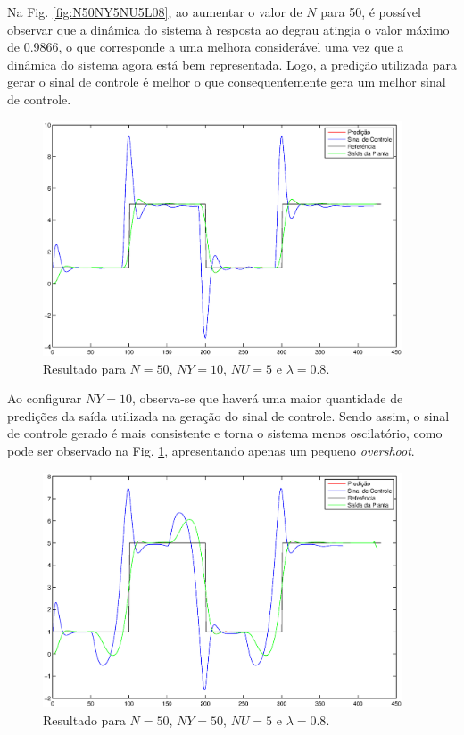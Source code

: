 Na Fig. \ref{fig:N50NY5NU5L08}, ao aumentar o valor de $N$ para 50, é possível
observar que a dinâmica do sistema à resposta ao degrau atingia o valor máximo
de 0.9866, o que corresponde a uma melhora considerável uma vez que a dinâmica
do sistema agora está bem representada. Logo, a predição utilizada para gerar o
sinal de controle é melhor o que consequentemente gera um melhor sinal de
controle.

\begin{figure}[htb]
\centering
    \includegraphics[width=0.95\textwidth]{imgs/questao1/N50NY10NU5L08}
    \caption{Resultado para $N = 50$, $NY = 10$, $NU = 5$ e $\lambda = 0.8$.}
    \label{fig:N50NY10NU5L08}
\end{figure}

Ao configurar $NY=10$, observa-se que haverá uma maior quantidade de predições
da saída utilizada na geração do sinal de controle. Sendo assim, o sinal de
controle gerado é mais consistente e torna o sistema menos oscilatório, como
pode ser observado na Fig. \ref{fig:N50NY10NU5L08}, apresentando apenas um
pequeno {\it overshoot}.

\begin{figure}[htb]
\centering
    \includegraphics[width=0.95\textwidth]{imgs/questao1/N50NY50NU5L08}
    \caption{Resultado para $N = 50$, $NY = 50$, $NU = 5$ e $\lambda = 0.8$.}
    \label{fig:N50NY50NU5L08}
\end{figure}

